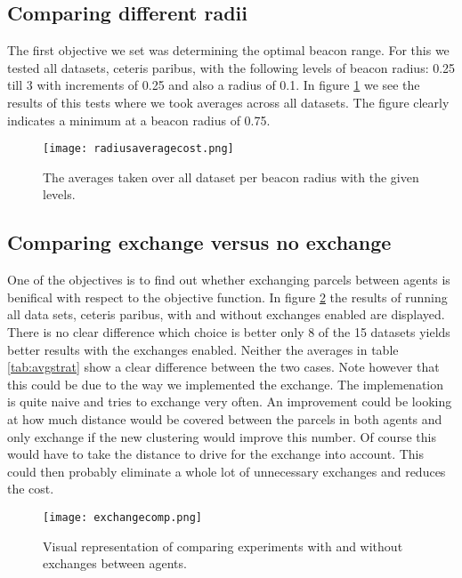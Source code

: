 \documentclass[../main.tex]{subfiles}
\begin{document}
\subsection{Comparing different radii}
The first objective we set was determining the optimal beacon range.
For this we tested all datasets, ceteris paribus, with the following levels of beacon radius: 0.25 till 3 with increments of 0.25 and also a radius of 0.1.  
In figure \ref{fig:rad} we see the results of this tests where we took averages across all datasets.
The figure clearly indicates a minimum at a beacon radius of 0.75.
\begin{figure}
	\centering
	\texttt{[image: radiusaveragecost.png]}
	\caption{The averages taken over all dataset per beacon radius with the given levels.}
	\label{fig:rad}
\end{figure}

\subsection{Comparing exchange versus no exchange}
One of the objectives is to find out whether exchanging parcels between agents is benifical with respect to the objective function.
In figure \ref{fig:exch} the results of running all data sets, ceteris paribus, with and without exchanges enabled are displayed.
There is no clear difference which choice is better only 8 of the 15 datasets yields better results with the exchanges enabled.
Neither the averages in table \ref{tab:avgstrat} show a clear difference between the two cases.
Note however that this could be due to the way we implemented the exchange. 
The implemenation is quite naive and tries to exchange very often. 
An improvement could be looking at how much distance would be covered between the parcels in both agents and only exchange if the new clustering would improve this number.
Of course this would have to take the distance to drive for the exchange into account.
This could then probably eliminate a whole lot of unnecessary exchanges and reduces the cost.

\begin{figure}
	\centering
	\texttt{[image: exchangecomp.png]}
	\caption{Visual representation of comparing experiments with and without exchanges between agents.}
	\label{fig:exch}
\end{figure}
\end{document}
